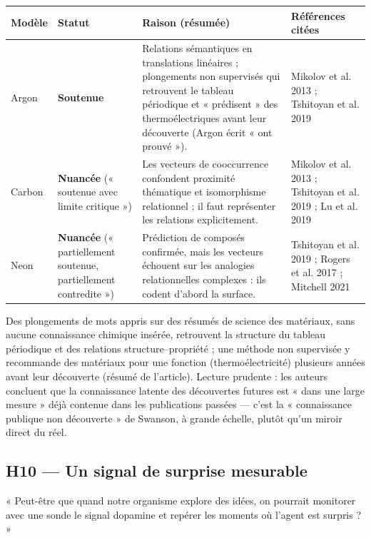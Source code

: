 \documentclass[a4paper,11pt]{article}
\makeatletter
\newenvironment{avis}{\small\renewcommand{\arraystretch}{1.15}%
\begin{longtable}{@{}>{\raggedright\arraybackslash}p{1.35cm}>{\raggedright\arraybackslash}p{2.45cm}>{\raggedright\arraybackslash}p{7.15cm}>{\raggedright\arraybackslash}p{4.4cm}@{}}
\toprule \textbf{Modèle} & \textbf{Statut} & \textbf{Raison (résumée)} & \textbf{Références citées}\\ \midrule \endhead
\bottomrule \endfoot}{\end{longtable}}
\newcommand{\st}[1]{\textbf{#1}}
\makeatother
\begin{document}
\begin{avis}
Argon & \st{Soutenue} & Relations sémantiques en translations linéaires ; plongements non supervisés qui retrouvent le tableau périodique et « prédisent » des thermoélectriques avant leur découverte (Argon écrit « ont prouvé »). & Mikolov et al. 2013 ; Tshitoyan et al. 2019\\ \midrule
Carbon & \st{Nuancée} (« soutenue avec limite critique ») & Les vecteurs de cooccurrence confondent proximité thématique et isomorphisme relationnel ; il faut représenter les relations explicitement. & Mikolov et al. 2013 ; Tshitoyan et al. 2019 ; Lu et al. 2019\\ \midrule
Neon & \st{Nuancée} (« partiellement soutenue, partiellement contredite ») & Prédiction de composés confirmée, mais les vecteurs échouent sur les analogies relationnelles complexes : ils codent d'abord la surface. & Tshitoyan et al. 2019 ; Rogers et al. 2017 ; Mitchell 2021\\
\end{avis}

\begin{exemple}
Des plongements de mots appris sur des résumés de science des matériaux, sans aucune connaissance chimique insérée, retrouvent la structure du tableau périodique et des relations structure–propriété ; une méthode non supervisée y recommande des matériaux pour une fonction (thermoélectricité) plusieurs années avant leur découverte (résumé de l'article). Lecture prudente : les auteurs concluent que la connaissance latente des découvertes futures est « dans une large mesure » déjà contenue dans les publications passées — c'est la « connaissance publique non découverte » de Swanson, à grande échelle, plutôt qu'un miroir direct du réel.
\end{exemple}

\subsection{H10 — Un signal de surprise mesurable}
\begin{enonce}
« Peut-être que quand notre organisme explore des idées, on pourrait monitorer avec une sonde le signal dopamine et repérer les moments où l'agent est surpris ? »
\end{enonce}
\end{document}
